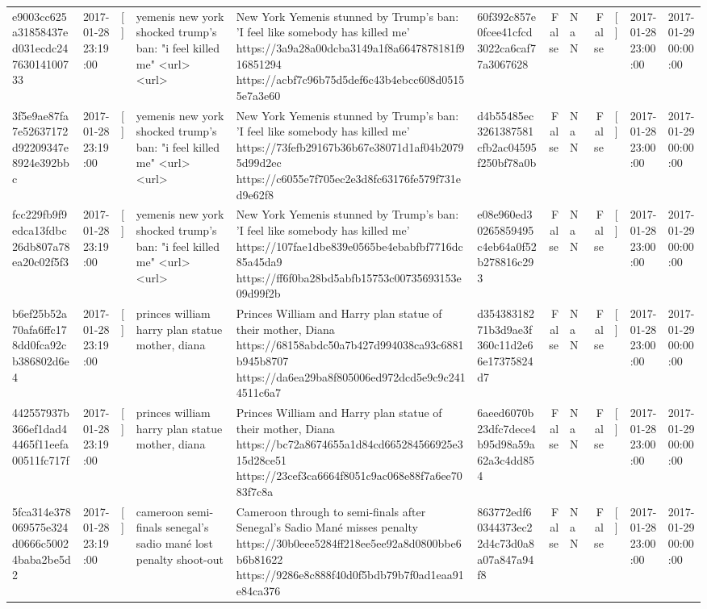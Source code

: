 \begin{tabular}{llllllrlrlll}
e9003cc625a31858437ed031ecdc24763014100733 & 2017-01-28 23:19:00 & [] & yemenis new york shocked trump's ban: "i feel killed me" <url> <url> & New York Yemenis stunned by Trump's ban: 'I feel like somebody has killed me' https://3a9a28a00dcba3149a1f8a6647878181f916851294 https://acbf7c96b75d5def6c43b4ebcc608d05155e7a3e60 & 60f392c857e0fcee41cfcd3022ca6caf77a3067628 & False & NaN & False & [] & 2017-01-28 23:00:00 & 2017-01-29 00:00:00 \\
3f5e9ae87fa7e52637172d92209347e8924e392bbc & 2017-01-28 23:19:00 & [] & yemenis new york shocked trump's ban: "i feel killed me" <url> <url> & New York Yemenis stunned by Trump's ban: 'I feel like somebody has killed me' https://73fefb29167b36b67e38071d1af04b20795d99d2ec https://c6055e7f705ec2e3d8fc63176fe579f731ed9e62f8 & d4b55485ec3261387581cfb2ac04595f250bf78a0b & False & NaN & False & [] & 2017-01-28 23:00:00 & 2017-01-29 00:00:00 \\
fcc229fb9f9edca13fdbc26db807a78ea20c02f5f3 & 2017-01-28 23:19:00 & [] & yemenis new york shocked trump's ban: "i feel killed me" <url> <url> & New York Yemenis stunned by Trump's ban: 'I feel like somebody has killed me' https://107fae1dbe839e0565be4ebabfbf7716dc85a45da9 https://ff6f0ba28bd5abfb15753c00735693153e09d99f2b & e08e960ed30265859495c4eb64a0f52b278816c293 & False & NaN & False & [] & 2017-01-28 23:00:00 & 2017-01-29 00:00:00 \\
b6ef25b52a70afa6ffc178dd0fca92cb386802d6e4 & 2017-01-28 23:19:00 & [] & princes william harry plan statue mother, diana & Princes William and Harry plan statue of their mother, Diana https://68158abdc50a7b427d994038ca93c6881b945b8707 https://da6ea29ba8f805006ed972dcd5e9c9c2414511c6a7 & d35438318271b3d9ae3f360c11d2e66e17375824d7 & False & NaN & False & [] & 2017-01-28 23:00:00 & 2017-01-29 00:00:00 \\
442557937b366ef1dad44465f11eefa00511fc717f & 2017-01-28 23:19:00 & [] & princes william harry plan statue mother, diana & Princes William and Harry plan statue of their mother, Diana https://bc72a8674655a1d84cd665284566925e315d28ce51 https://23cef3ca6664f8051c9ac068e88f7a6ee7083f7c8a & 6aeed6070b23dfc7dece4b95d98a59a62a3c4dd854 & False & NaN & False & [] & 2017-01-28 23:00:00 & 2017-01-29 00:00:00 \\
5fca314e378069575e324d0666c50024baba2be5d2 & 2017-01-28 23:19:00 & [] & cameroon semi-finals senegal's sadio mané lost penalty shoot-out & Cameroon through to semi-finals after Senegal’s Sadio Mané misses penalty https://30b0eee5284ff218ee5ee92a8d0800bbe6b6b81622 https://9286e8c888f40d0f5bdb79b7f0ad1eaa91e84ca376 & 863772edf60344373ec22d4c73d0a8a07a847a94f8 & False & NaN & False & [] & 2017-01-28 23:00:00 & 2017-01-29 00:00:00 \\

\end{tabular}
